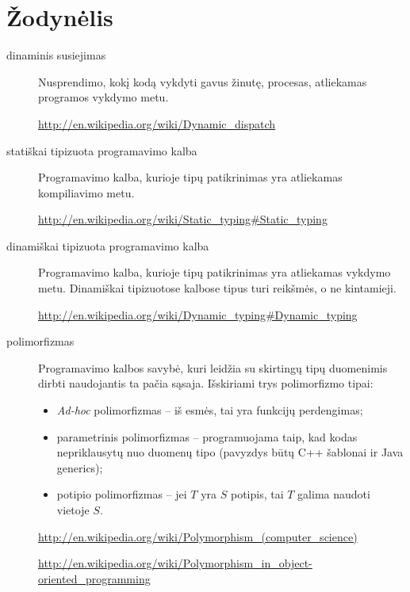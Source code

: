 \chapter{Žodynėlis}

\begin{description}

  \item[dinaminis susiejimas ]
    Nusprendimo, kokį kodą vykdyti gavus žinutę, procesas,
    atliekamas programos vykdymo metu.

    \url{http://en.wikipedia.org/wiki/Dynamic_dispatch}

  \item[statiškai tipizuota programavimo kalba ] 
    Programavimo kalba, kurioje tipų patikrinimas yra atliekamas kompiliavimo
    metu.

    \url{http://en.wikipedia.org/wiki/Static_typing#Static_typing}

  \item[dinamiškai tipizuota programavimo kalba ]
    Programavimo kalba, kurioje tipų patikrinimas yra atliekamas vykdymo
    metu. Dinamiškai tipizuotose kalbose tipus turi reikšmės, o ne
    kintamieji.

    \url{http://en.wikipedia.org/wiki/Dynamic_typing#Dynamic_typing}

  \item[polimorfizmas ]
    Programavimo kalbos savybė, kuri leidžia su skirtingų tipų duomenimis
    dirbti naudojantis ta pačia sąsaja. Išskiriami trys polimorfizmo tipai:
    \begin{itemize}
      \item \emph{Ad-hoc} polimorfizmas  –
        iš esmės, tai yra funkcijų perdengimas;
      \item parametrinis polimorfizmas  –
        programuojama taip, kad kodas nepriklausytų nuo duomenų tipo
        (pavyzdys būtų C++ šablonai ir Java generics);
      \item potipio polimorfizmas  – 
        jei $T$ yra $S$ potipis, tai $T$ galima naudoti vietoje $S$.
    \end{itemize}

    \url{http://en.wikipedia.org/wiki/Polymorphism_(computer_science)}

    \url{http://en.wikipedia.org/wiki/Polymorphism_in_object-oriented_programming}


\end{description}
